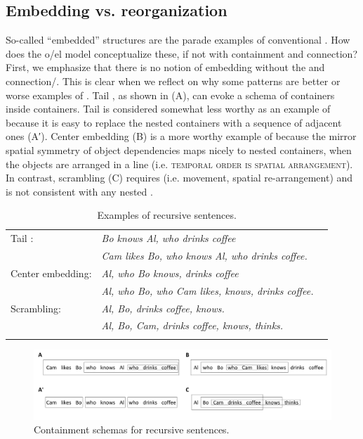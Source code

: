 \subsection{Embedding vs. reorganization}

So-called “embedded” structures are the parade examples of conventional . How does the o/el model conceptualize these, if not with containment and connection? First, we emphasize that there is no notion of embedding without the  and connection/. This is clear when we reflect on why some patterns are better or worse examples of . Tail , as shown in {}(A), can evoke a schema of containers inside containers. Tail  is considered somewhat less worthy as an example of  because it is easy to replace the nested containers with a sequence of adjacent ones (A′). Center embedding (B) is a more worthy example of  because the mirror spatial symmetry of object dependencies maps nicely to nested containers, when the objects are arranged in a line (i.e. \textsc{temporal order is spatial arrangement}). In contrast, scrambling (C) requires  (i.e. movement, spatial re-arrangement) and is not consistent with any nested .

\begin{table}
\begin{tabularx}{\textwidth}{lQQ}
\lsptoprule
Tail : & \textit{Bo knows Al, who drinks coffee} \\
 & \textit{Cam likes Bo, who knows Al, who drinks coffee.}\\
Center embedding: & \textit{Al, who Bo knows, drinks coffee}\\
 & \textit{Al, who Bo, who Cam likes, knows, drinks coffee.}\\
Scrambling: & \textit{Al, Bo, drinks coffee, knows.}\\
 & \textit{Al, Bo, Cam, drinks coffee, knows, thinks.}\\
\lspbottomrule
\end{tabularx}
\caption{Examples of recursive sentences.}\label{tab:5:3}
\end{table}
  
\begin{figure}
\includegraphics[width=\textwidth]{figures/Tilsen-img118.png}
\caption{Containment schemas for recursive sentences.}
\label{fig:5:14}
\end{figure}
 

